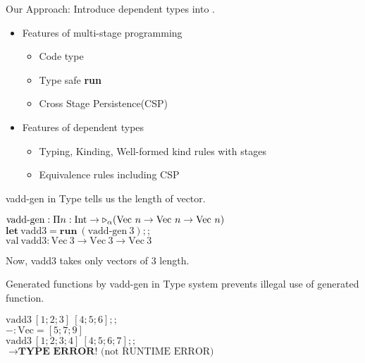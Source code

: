\documentclass[dvipdfmx,aspectratio=169, 20pt]{beamer}
\begin{document}
\begin{frame}[fragile]{Our Approach: \LMD}
    Introduce dependent types into .
    \begin{itemize}
        \item Features of multi-stage programming
            \begin{itemize}
                \item Code type
                \item Type safe {\bf{run}}
                \item Cross Stage Persistence(CSP)
            \end{itemize}
        \item Features of dependent types
            \begin{itemize}
                \item Typing, Kinding, Well-formed kind rules with stages
                \item Equivalence rules including CSP
            \end{itemize}
    \end{itemize}
\end{frame}

\begin{frame}[fragile]{vadd-gen in \LMD}
    Type tells us the length of vector.
    \newcommand{\Vn}{\text{Vec}\ n}
    \newcommand{\Vt}{\text{Vec}\ 3}
    \begin{tabbing}
        \( \text{vadd-gen} : \Pi n:\I \to \TW_\alpha (\Vn \to \Vn \to \Vn) \) \\[2mm]
        \( \textbf{let}\ \text{vadd3} = \textbf{run}\ (\text{vadd-gen}\ 3);; \) \\
        \( \text{val}\ \text{vadd3} : \Vt \to \Vt \to \Vt \) \\[2mm]
    \end{tabbing}
    Now, vadd3 takes only vectors of 3 length.
\end{frame}

\begin{frame}[fragile]{Generated functions by vadd-gen in \LMD}
    Type system prevents illegal use of generated function.
    \renewcommand{\V}{\text{Vec}}
    \begin{tabbing}
        \( \text{vadd3}\ [1;2;3]\ [4;5;6];; \) \\
        \( - : \V = [5;7;9] \) \\[2mm]
        \( \text{vadd3}\ [1;2;3;4]\ [4;5;6;7];; \) \\
        \( \longrightarrow \textbf{TYPE ERROR!} \text{ (not RUNTIME ERROR)} \)
    \end{tabbing}
\end{frame}
\end{document}
